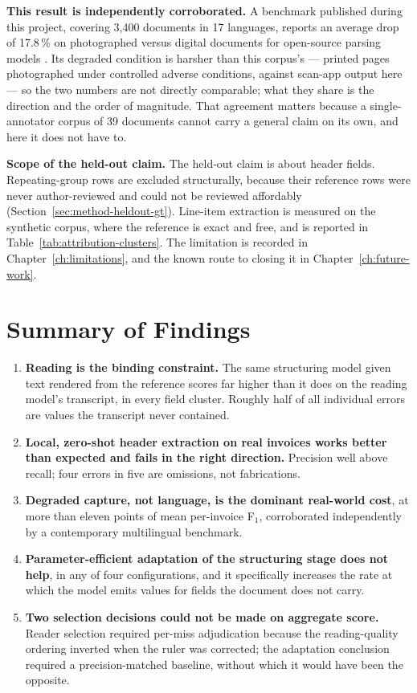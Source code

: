 \textbf{This result is independently corroborated.} A benchmark published during this project,
covering 3{,}400 documents in 17 languages, reports an average drop of 17.8\,\% on photographed
versus digital documents for open-source parsing models \parencite{mdpbench2026}. Its degraded
condition is harsher than this corpus's --- printed pages photographed under controlled
adverse conditions, against scan-app output here --- so the two numbers are not directly
comparable; what they share is the direction and the order of magnitude. That agreement
matters because a single-annotator corpus of 39 documents cannot carry a general claim on its
own, and here it does not have to.

\textbf{Scope of the held-out claim.} The held-out claim is about header fields.
Repeating-group rows are excluded structurally,
because their reference rows were never author-reviewed and could not be reviewed affordably
(Section~\ref{sec:method-heldout-gt}). Line-item extraction is measured on the synthetic corpus,
where the reference is exact and free, and is reported in
Table~\ref{tab:attribution-clusters}. The limitation is recorded in
Chapter~\ref{ch:limitations}, and the known route to closing it in Chapter~\ref{ch:future-work}.

\section{Summary of Findings}
\label{sec:results-summary}

\begin{enumerate}
  \item \textbf{Reading is the binding constraint.} The same structuring model given text
        rendered from the reference scores far higher than it does on the reading model's
        transcript, in every field cluster. Roughly half of all individual errors are values
        the transcript never contained.
  \item \textbf{Local, zero-shot header extraction on real invoices works better than expected
        and fails in the right direction.} Precision well above recall; four errors in five are
        omissions, not fabrications.
  \item \textbf{Degraded capture, not language, is the dominant real-world cost}, at more than
        eleven points of mean per-invoice F$_1$, corroborated independently by a contemporary
        multilingual benchmark.
  \item \textbf{Parameter-efficient adaptation of the structuring stage does not help}, in any
        of four configurations, and it specifically increases the rate at which the model emits
        values for fields the document does not carry.
  \item \textbf{Two selection decisions could not be made on aggregate score.} Reader selection
        required per-miss adjudication because the reading-quality ordering inverted when the
        ruler was corrected; the adaptation conclusion required a precision-matched baseline,
        without which it would have been the opposite.
\end{enumerate}
